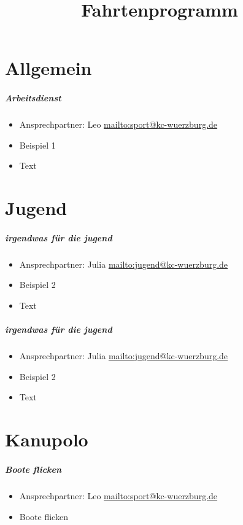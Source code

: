 \documentclass[12pt, a4paper]{report}
\title{Fahrtenprogramm}
\date{}
\begin{document}
\begingroup
    \hypersetup{hidelinks}
    \tableofcontents\thispagestyle{fancy}
\endgroup
\reversemarginpar

\chapter*{Allgemein}
\thispagestyle{Allgemein}
\pagestyle{Allgemein}
\paragraph{Arbeitsdienst}
\begin{itemize}
    \item Ansprechpartner: Leo \href{sport@kc-wuerzburg.de}{mailto:sport@kc-wuerzburg.de}
    \item Beispiel 1
    \item Text
\end{itemize}


\chapter*{Jugend}
\thispagestyle{Jugend}
\pagestyle{Jugend}
\paragraph{irgendwas für die jugend}
\begin{itemize}
    \item Ansprechpartner: Julia \href{jugend@kc-wuerzburg.de}{mailto:jugend@kc-wuerzburg.de}
    \item Beispiel 2
    \item Text
\end{itemize}

\paragraph{irgendwas für die jugend}
\begin{itemize}
    \item Ansprechpartner: Julia \href{jugend@kc-wuerzburg.de}{mailto:jugend@kc-wuerzburg.de}
    \item Beispiel 2
    \item Text
\end{itemize}


\chapter*{Kanupolo}
\thispagestyle{Kanupolo}
\pagestyle{Kanupolo}
\paragraph{Boote flicken}
\begin{itemize}
    \item Ansprechpartner: Leo \href{sport@kc-wuerzburg.de}{mailto:sport@kc-wuerzburg.de}
    \item Boote flicken
\end{itemize}
\end{document}

